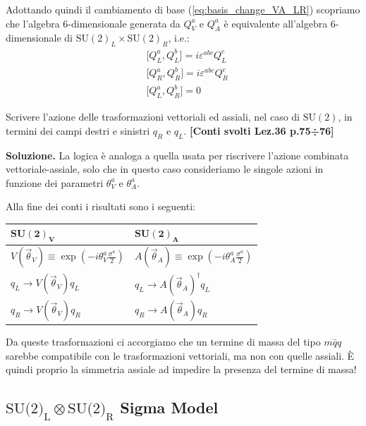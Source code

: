 \documentclass[../main.tex]{subfiles}
\begin{document}
Adottando quindi il cambiamento di base (\ref{eq:basis_change_VA_LR}) scopriamo che l'algebra 6-dimensionale generata da $Q_V^a$ e $Q_A^a$ è equivalente all'algebra 6-dimensionale di $\textrm{SU}(2)_L\times \textrm{SU}(2)_R$, i.e.:
\begin{equation}
    \begin{aligned}
        &\big[Q_L^a,Q_L^b\big] = i\varepsilon^{abc}Q_L^c \\
        &\big[Q_R^a,Q_R^b\big] = i\varepsilon^{abc}Q_R^c \\
        &\big[Q_L^a,Q_R^b\big] = 0
    \end{aligned}
    \label{eq:leftright_charges_algebra}
\end{equation}
\begin{exercise}
    Scrivere l'azione delle trasformazioni vettoriali ed assiali, nel caso di $\textrm{SU}(2)$, in termini dei campi destri e sinistri $q_R$ e $q_L$. \textbf{[Conti svolti Lez.36 p.75÷76]}

    \textbf{Soluzione. } La logica è analoga a quella usata per riscrivere l'azione combinata vettoriale-assiale, solo che in questo caso consideriamo le singole azioni in funzione dei parametri $\theta_V^a$ e $\theta_A^a$. 

    Alla fine dei conti i risultati sono i seguenti:
    \begin{center}
    \begin{tabular}{l|l}
        ${\textbf{SU}\mathbf{(2)_V}}$ & ${\textbf{SU}\mathbf{(2)_A}} $ \\ \hline
         $V(\Vec{\theta}_V)\equiv\exp(-i\theta_V^a\frac{\sigma^a}{2})$ & $A(\Vec{\theta}_A) \equiv \exp(-i\theta_A^a\frac{\sigma^a}{2})$\\
        $q_L \rightarrow V(\Vec{\theta}_V)q_L$ &  $q_L \rightarrow A(\Vec{\theta}_A)^\dagger q_L$ \\
        $q_R \rightarrow V(\Vec{\theta}_V)q_R$ &  $q_R \rightarrow A(\Vec{\theta}_A)q_R$
    \end{tabular}
    \end{center}
    Da queste trasformazioni ci accorgiamo che un termine di massa del tipo $m\bar q q$ sarebbe compatibile con le trasformazioni vettoriali, ma non con quelle assiali. È quindi proprio la simmetria assiale ad impedire la presenza del termine di massa!
    \label{ex:axial_vectorial_SU2transf_chiral}
\end{exercise}

\subsection{$\text{SU}\text{(2)}_\text{L}\otimes \text{SU}\text{(2)}_\text{R}$ Sigma Model}
\end{document}
